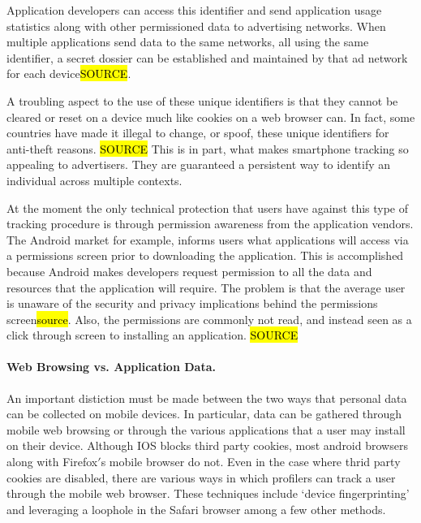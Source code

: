 Application developers can access this identifier and send application usage statistics along with other permissioned data to advertising networks. When multiple applications send data to the same networks, all using the same identifier, a secret dossier can be established and maintained by that ad network for each device\hl{SOURCE}.

A troubling aspect to the use of these unique identifiers is that they cannot be cleared or reset on a device much like cookies on a web browser can. In fact, some countries have made it illegal to change, or spoof, these unique identifiers for anti-theft reasons. \hl{SOURCE} This is in part, what makes smartphone tracking so appealing to advertisers. They are guaranteed a persistent way to identify an individual across multiple contexts.

At the moment the only technical protection that users have against this type of tracking procedure is through permission awareness from the application vendors. The Android market for example, informs users what applications will access via a permissions screen prior to downloading the application. This is accomplished because Android makes developers request permission to all the data and resources that the application will require. The problem is that the average user is unaware of the security and privacy implications behind the permissions screen\hl{source}. Also, the permissions are commonly not read, and instead seen as a click through screen to installing an application. \hl{SOURCE}  

		\paragraph{Web Browsing vs. Application Data.}
An important distiction must be made between the two ways that personal data can be collected on mobile devices. In particular, data can be gathered through mobile web browsing or through the various applications that a user may install on their device. Although IOS blocks third party cookies, most android browsers along with Firefox$'$s mobile browser do not\cite{Trust2013b}.  Even in the case where thrid party cookies are disabled, there are various ways in which profilers can track a user through the mobile web browser. These techniques include `device fingerprinting'\cite{Eff2010} and leveraging a loophole in the Safari browser \cite{John2012} among a few other methods\cite{Trust2013b}. 

